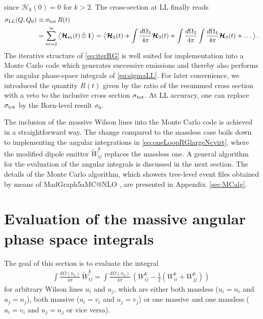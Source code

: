 \documentclass[11pt,a4paper]{article}
\begin{document}
 since $\bm{\mathcal{H}}_{k}(0)=0$ for $k>2$. The cross-section at LL finally reads
\begin{align}\label{eq:sigmaLL}
\sigma_{\rm LL}(Q,Q_0) &\equiv \sigma_{\rm tot} \, R(t) \nonumber \\
&=  \sum_{m=2}^\infty \big\langle  \bm{\mathcal{H}}_m(t) \,\hat{\otimes}\, \bm{1} \big\rangle= \big\langle \bm{\mathcal{H}}_2(t) + \int \frac{d\Omega_3}{4\pi} \bm{\mathcal{H}}_{3}(t) +\int \frac{d\Omega_3}{4\pi}\int \frac{d\Omega_4}{4\pi}  \bm{\mathcal{H}}_{4}(t) + \dots \big\rangle \, .
\end{align}
The iterative structure of \eqref{eq:iterRG} is well suited for implementation into a Monte Carlo code which generates successive emissions and thereby also performs the angular phase-space integrals of \eqref{eq:sigmaLL}. For later convenience, we introduced the quantity $R(t)$ given by the ratio of the resummed cross section with a veto to the inclusive cross section $\sigma_{\rm tot}$. At LL accuracy, one can replace $\sigma_{\rm tot}$ by the Born-level result $\sigma_0$.

The inclusion of the massive Wilson lines into the Monte Carlo code is achieved in a straightforward way. The change compared to the massless case boils down to implementing the angular integrations in \eqref{eq:oneLoopRGlargeNcvirt}, where the modified dipole emitter $\widetilde{W}_{ij}^k$ replaces the massless one. A general algorithm for the evaluation of the angular integrals is discussed in the next section. The details of the Monte Carlo algorithm, which showers tree-level event files obtained by means of  {\sc MadGraph5\Q{_}aMC@NLO}  \cite{Alwall:2014hca}, are presented in Appendix~\ref{sec:MCalg}.


\section{Evaluation of the massive angular phase space integrals} \label{sec:evaluation}

The goal of this section is to evaluate the integral 
\begin{align}
\int\frac{d\Omega(n_k)}{4\pi}\,  \widetilde{W}_{ij}^k=	\int\frac{d\Omega(n_k)}{4\pi}\, \left(W_{ij}^k -\frac{1}{2}\left(W_{ii}^k+W_{jj}^k\right)\right) \, \label{eq:angint}
\end{align}
for arbitrary Wilson lines $u_i$ and $u_j$,  which are either both massless ($u_i=n_i$ and $u_j=n_j$), both massive ($u_i=v_i$ and $u_j=v_j$) or one massive and one massless ($u_i = v_i$ and $u_j = n_j$ or vice versa). 
\end{document}
